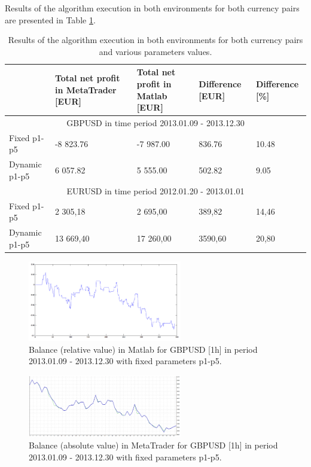 \documentclass[runningheads,a4paper]{llncs}
\begin{document}
Results of the algorithm execution in both environments for both currency pairs are presented in Table \ref{tab:tab5}.
\begin{table}[h!]
\centering
\caption{Results of the algorithm execution in both environments for both currency pairs and various parameters values.}
\label{tab:tab5}
\begin{tabular}{|p{}|p{}|p{}|p{}|p{}|} \hline
 &  Total net profit in MetaTrader [EUR]	 &  Total net profit in Matlab 
[EUR]	 &  Difference [EUR]	 &  Difference [\%]\\ \hline
\multicolumn{5}{|c|}{GBPUSD in time period 2013.01.09 - 2013.12.30}\\ \hline
Fixed p1-p5	 & -8 823.76 & 	-7 987.00 & 	836.76 & 	10.48\\
Dynamic p1-p5	 & 6 057.82	 & 5 555.00	 & 502.82 & 	9.05\\ \hline
\multicolumn{5}{|c|}{EURUSD in time period 2012.01.20 - 2013.01.01}\\ \hline
Fixed p1-p5	 & 2 305,18 & 	2 695,00	 & 389,82	 & 14,46\\
Dynamic p1-p5 & 	13 669,40 & 	17 260,00 & 	3590,60	 & 20,80\\ \hline
\end{tabular}
\end{table}
\FloatBarrier

\begin{figure}[h!]
\centering
\includegraphics[width = 0.6\textwidth]{figures/rys12.png}
\caption{Balance (relative value) in Matlab for GBPUSD [1h] in period 2013.01.09 - 2013.12.30 with fixed parameters p1-p5.}
\label{fig:fig12}
\end{figure}
\FloatBarrier
\begin{figure}[h!]
\centering
\includegraphics[width = 0.6\textwidth]{figures/rys13.png}
\caption{Balance (absolute value) in MetaTrader for GBPUSD [1h] in period 2013.01.09 - 2013.12.30 with fixed parameters p1-p5.}
\label{fig:fig13}
\end{figure}
\FloatBarrier
\end{document}
